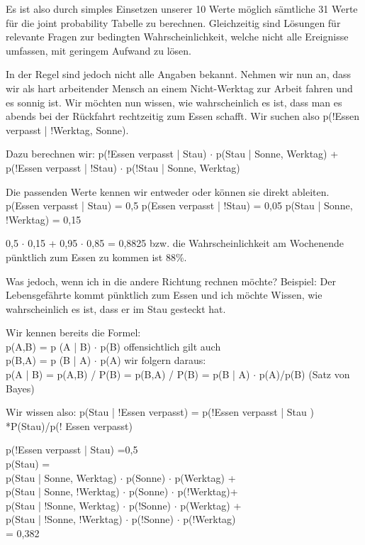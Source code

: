 Es ist also durch simples Einsetzen unserer 10 Werte möglich sämtliche 31 Werte für die joint probability Tabelle zu berechnen.
Gleichzeitig sind Lösungen für relevante Fragen zur bedingten Wahrscheinlichkeit, welche nicht alle Ereignisse umfassen, mit geringem Aufwand zu lösen.


In der Regel sind jedoch nicht alle Angaben bekannt.
Nehmen wir nun an, dass wir als hart arbeitender Mensch an einem Nicht-Werktag zur Arbeit fahren und es sonnig ist.
Wir möchten nun wissen, wie wahrscheinlich es ist, dass man es abends bei der Rückfahrt rechtzeitig zum Essen schafft.
Wir suchen also p(!Essen verpasst | !Werktag, Sonne).

Dazu berechnen wir:
p(!Essen verpasst | Stau) $\cdot$ p(Stau | Sonne, Werktag) + p(!Essen verpasst | !Stau) $\cdot$ p(!Stau | Sonne, Werktag)

Die passenden Werte kennen wir entweder oder können sie direkt ableiten.
p(Essen verpasst | Stau) = 0,5
p(Essen verpasst | !Stau) = 0,05
p(Stau | Sonne, !Werktag) = 0,15

0,5 $\cdot$ 0,15 + 0,95 $\cdot$ 0,85 = 0,8825 bzw. die Wahrscheinlichkeit am Wochenende pünktlich zum Essen zu kommen ist 88\%.

Was jedoch, wenn ich in die andere Richtung rechnen möchte?
Beispiel: Der Lebensgefährte kommt pünktlich zum Essen und ich möchte Wissen, wie wahrscheinlich es ist, dass er im Stau gesteckt hat.

Wir kennen bereits die Formel:\\
p(A,B) = p (A | B) $\cdot$ p(B) offensichtlich gilt auch\\
p(B,A) = p (B | A) $\cdot$ p(A) wir folgern daraus:\\
p(A | B) = p(A,B) / P(B) = p(B,A) / P(B) = p(B | A) $\cdot$ p(A)/p(B) (Satz von Bayes)

Wir wissen also:
p(Stau | !Essen verpasst) = p(!Essen verpasst | Stau ) *P(Stau)/p(! Essen verpasst)

p(!Essen verpasst | Stau) =0,5\\
p(Stau) =\\
p(Stau | Sonne, Werktag) $\cdot$ p(Sonne) $\cdot$ p(Werktag) + \\ p(Stau | Sonne, !Werktag) $\cdot$ p(Sonne) $\cdot$ p(!Werktag)+ \\ p(Stau | !Sonne, Werktag) $\cdot$ p(!Sonne) $\cdot$ p(Werktag) + \\ p(Stau | !Sonne, !Werktag) $\cdot$ p(!Sonne) $\cdot$ p(!Werktag)\\ = 0,382

